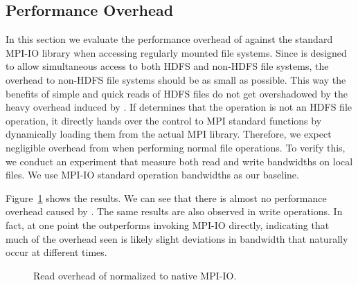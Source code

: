 \subsection{Performance Overhead}
In this section we evaluate the performance overhead of {\proj} against the standard
MPI-IO library when accessing regularly mounted file systems. Since {\proj} is designed
to allow simultaneous access to both HDFS and non-HDFS file systems, the overhead to non-HDFS
file systems should be as small as possible. This way the benefits of simple and quick reads
of HDFS files do not get overshadowed by the heavy overhead induced by {\proj}.
If {\proj} determines that the operation is not an HDFS file operation, it directly hands over the control to
MPI standard functions by dynamically loading them from the actual MPI library. Therefore, we expect negligible
overhead from {\proj} when performing normal file operations. To verify this, we
conduct  an experiment that measure both read and write bandwidths on local files. We use MPI-IO
standard operation bandwidths as our baseline. 

Figure~\ref{fig:over} shows the results. We can see that there is almost no
performance overhead caused by {\proj}. The same results are also observed in write
operations. In fact, at one point the {\proj} outperforms invoking MPI-IO directly,
indicating that much of the overhead seen is likely slight deviations in bandwidth
that naturally occur at different times.

\begin{figure}[t]
\begin{center}
\caption{\small Read overhead of {\proj} normalized to native MPI-IO.}
\label{fig:over}
\vspace{-6pt}
\end{center}
\end{figure}
